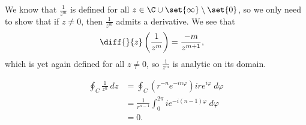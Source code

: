 \documentclass[10pt]{mypackage}
\begin{document}
\begin{solution}[18.14]
  We know that $\frac{1}{z^m}$ is defined for all $z\in \C\cup\set{\infty}\setminus \set{0}$, so we only need to show that if $ z\neq 0 $, then $\frac{1}{z^m}$ admits a derivative. We see that
  \begin{align*}
    \diff{}{z}\left( \frac{1}{z^m} \right) &= \frac{-m}{z^{m+1}},
  \end{align*}
  which is yet again defined for all $z\neq 0$, so $\frac{1}{z^m}$ is analytic on its domain.
\end{solution}
\begin{solution}[18.15]
  \begin{align*}
    \oint_{C} \frac{1}{z^n}\:dz  &= \oint_{C}\left( r^{-n}e^{-in\varphi} \right)ire^{i\varphi}\:d\varphi\\
                                 &= \frac{1}{r^{n-1}}\int_{0}^{2\pi}ie^{-i\left( n-1 \right)\varphi}\:d\varphi\\
                                 &= 0.
  \end{align*}
\end{solution}
\end{document}
